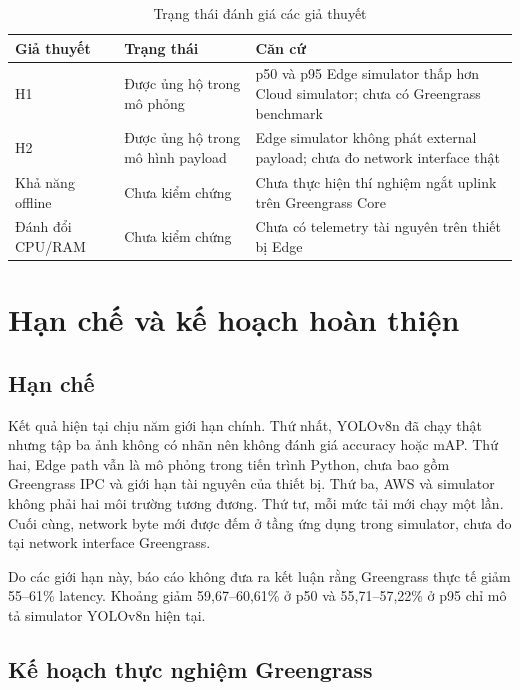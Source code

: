 \begin{table}[htbp]
    \centering
    \caption{Trạng thái đánh giá các giả thuyết}
    \label{tab:hypotheses}
    \begin{tabular}{|p{1.5cm}|p{5cm}|p{7cm}|}
        \hline
        \textbf{Giả thuyết} & \textbf{Trạng thái} & \textbf{Căn cứ} \\ \hline
        H1 & Được ủng hộ trong mô phỏng & p50 và p95 Edge simulator thấp hơn
        Cloud simulator; chưa có Greengrass benchmark \\ \hline
        H2 & Được ủng hộ trong mô hình payload & Edge simulator không phát
        external payload; chưa đo network interface thật \\ \hline
        Khả năng offline & Chưa kiểm chứng & Chưa thực hiện thí nghiệm ngắt uplink
        trên Greengrass Core \\ \hline
        Đánh đổi CPU/RAM & Chưa kiểm chứng & Chưa có telemetry tài nguyên trên thiết
        bị Edge \\ \hline
    \end{tabular}
\end{table}


\section{Hạn chế và kế hoạch hoàn thiện}

\subsection{Hạn chế}

Kết quả hiện tại chịu năm giới hạn chính. Thứ nhất, YOLOv8n đã chạy thật nhưng tập
ba ảnh không có nhãn nên không đánh giá accuracy hoặc mAP. Thứ hai, Edge path vẫn
là mô phỏng trong tiến trình Python, chưa bao gồm Greengrass IPC và giới hạn tài
nguyên của thiết bị. Thứ ba, AWS và simulator không phải hai môi trường tương
đương. Thứ tư, mỗi mức tải mới chạy một lần. Cuối cùng, network byte mới được đếm
ở tầng ứng dụng trong simulator, chưa đo tại network interface Greengrass.

Do các giới hạn này, báo cáo không đưa ra kết luận rằng Greengrass thực tế giảm
55--61\% latency. Khoảng giảm 59,67--60,61\% ở p50 và 55,71--57,22\% ở p95 chỉ
mô tả simulator YOLOv8n hiện tại.

\subsection{Kế hoạch thực nghiệm Greengrass}

